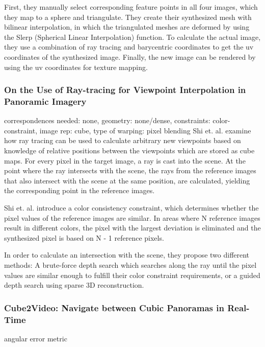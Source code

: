 First, they manually select corresponding feature points in all four images, which they map to a sphere and triangulate. They create their synthesized mesh with bilinear interpolation, in which the triangulated meshes are deformed by using the Slerp (Spherical Linear Interpolation) function. To calculate the actual image, they use a combination of ray tracing and barycentric coordinates to get the uv coordinates of the synthesized image. Finally, the new image can be rendered by using the uv coordinates for texture mapping.

\subsubsection{On the Use of Ray-tracing for Viewpoint Interpolation in Panoramic Imagery}
correspondences needed: none, geometry: none/dense, constraints: color-constraint, image rep: cube, type of warping: pixel blending
Shi et. al. \cite{raytracing} examine how ray tracing can be used to calculate arbitrary new viewpoints based on knowledge of relative positions between the viewpoints which are stored as cube maps. For every pixel in the target image, a ray is cast into the scene. At the point where the ray intersects with the scene, the rays from the reference images that also intersect with the scene at the same position, are calculated, yielding the corresponding point in the reference images.

Shi et. al. introduce a color consistency constraint, which determines whether the pixel values of the reference images are similar. In areas where N reference images result in different colors, the pixel with the largest deviation is eliminated and the synthesized pixel is based on N - 1 reference pixels.

In order to calculate an intersection with the scene, they propose two different methods: A brute-force depth search which searches along the ray until the pixel values are similar enough to fulfill their color constraint requirements, or a guided depth search using sparse 3D reconstruction.

\subsubsection{Cube2Video: Navigate between Cubic Panoramas in Real-Time}
angular error metric
